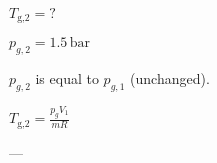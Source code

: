 \( T_{\text{g,2}} = ? \)  

\( p_{g,2} = 1.5 \, \text{bar} \)  

\( p_{g,2} \) is equal to \( p_{g,1} \) (unchanged).  

\( T_{\text{g,2}} = \frac{p_{g} V_{1}}{m R} \)  

---